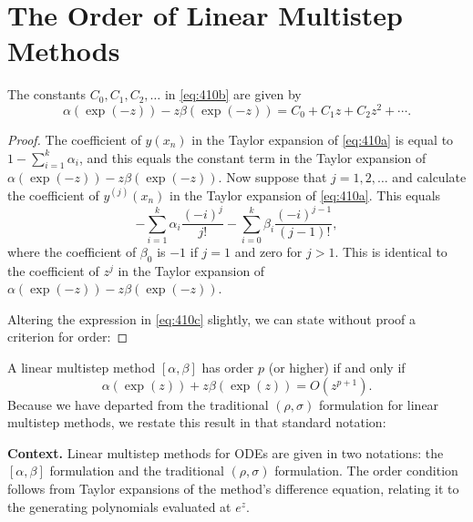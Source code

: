 \section{The Order of Linear Multistep Methods}

\begin{theorem}

  \label{thm:410A}
The constants $C_0, C_1, C_2, \dotsc$ in \eqref{eq:410b} are given by
\[
\alpha(\exp(-z)) - z\beta(\exp(-z)) = C_0 + C_1 z + C_2 z^2 + \cdots. \tag{410c}
\]
\end{theorem}

\begin{proof}
The coefficient of $y(x_n)$ in the Taylor expansion of \eqref{eq:410a} is equal to
$1 - \sum_{i=1}^k \alpha_i$, and this equals the constant term in the Taylor expansion of
$\alpha(\exp(-z)) - z\beta(\exp(-z))$. Now suppose that $j = 1, 2, \dotsc$ and calculate the
coefficient of $y^{(j)}(x_n)$ in the Taylor expansion of \eqref{eq:410a}. This equals
\[
-\sum_{i=1}^k \alpha_i \frac{(-i)^j}{j!} - \sum_{i=0}^k \beta_i \frac{(-i)^{j-1}}{(j-1)!},
\]
where the coefficient of $\beta_0$ is $-1$ if $j = 1$ and zero for $j > 1$. This is identical
to the coefficient of $z^j$ in the Taylor expansion of $\alpha(\exp(-z)) - z\beta(\exp(-z))$.

Altering the expression in \eqref{eq:410c} slightly, we can state without proof a
criterion for order:
\end{proof}

\begin{theorem}

  \label{thm:410B}
A linear multistep method $[\alpha, \beta]$ has order $p$ (or higher) if and only if
\[
\alpha(\exp(z)) + z\beta(\exp(z)) = O(z^{p+1}).
\]
Because we have departed from the traditional $(\rho, \sigma)$ formulation for linear multistep methods, we restate this result in that standard notation:
\end{theorem}

\noindent\textbf{Context.}
Linear multistep methods for ODEs are given in two notations: the $[\alpha,\beta]$ formulation and the traditional $(\rho,\sigma)$ formulation. The order condition follows from Taylor expansions of the method's difference equation, relating it to the generating polynomials evaluated at $e^{z}$.

